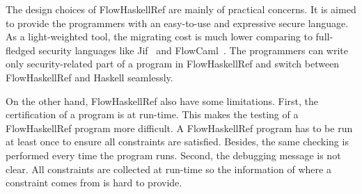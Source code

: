 \documentclass{report}
\begin{document}
The design choices of FlowHaskellRef are mainly of practical concerns. 
It is aimed to provide the programmers with an easy-to-use and expressive secure language.
As a light-weighted tool, the migrating cost is much lower comparing to full-fledged security languages
like Jif~\cite{jif} and FlowCaml~\cite{FlowCaml}.
The programmers can write only security-related part of a program in FlowHaskellRef and switch between 
FlowHaskellRef and Haskell seamlessly.

On the other hand, FlowHaskellRef also have some limitations. First, the certification of a program is at
run-time. This makes the testing of a FlowHaskellRef program more difficult. A FlowHaskellRef program has to be 
run at least once to ensure all constraints are satisfied. Besides, the same checking is performed every time
the program runs. Second, the debugging message is not clear. All constraints are collected at run-time so
the information of where a constraint comes from is hard to provide.




\end{document}
